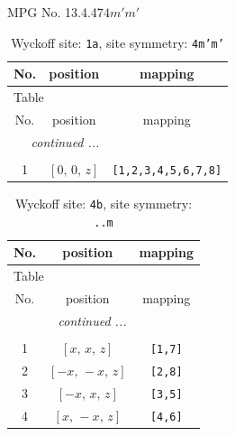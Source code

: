 \documentclass[fleqn,8pt]{jsarticle}
\begin{document}
\setcounter{MaxMatrixCols}{32}

\renewcommand{\tablename}{Table~}
\renewcommand{\figurename}{Figure~}
\begin{center}
\LARGE
MPG No. 13.4.47\quad$4m'm'$
\end{center}
\renewcommand{\arraystretch}{1.2}
\begin{longtable}{ccc}
\caption{Wyckoff site: {\tt 1a}, site symmetry: {\tt 4m'm'}}
 \\
 \hline \hline
No. & position & mapping \\ \hline \endfirsthead

\multicolumn{2}{l}{\tablename\ \thetable{}} \\
 \hline \hline
No. & position & mapping \\ \hline \endhead

 \hline \hline
\multicolumn{2}{r}{\footnotesize\it continued ...} \\ \endfoot

 \hline \hline
\multicolumn{2}{r}{} \\ \endlastfoot

1 & $\left[ 0,\, 0,\, z \right]$ & {\tt [1,2,3,4,5,6,7,8]} \\
\end{longtable}
\renewcommand{\arraystretch}{1.2}
\begin{longtable}{ccc}
\caption{Wyckoff site: {\tt 4b}, site symmetry: {\tt ..m}}
 \\
 \hline \hline
No. & position & mapping \\ \hline \endfirsthead

\multicolumn{2}{l}{\tablename\ \thetable{}} \\
 \hline \hline
No. & position & mapping \\ \hline \endhead

 \hline \hline
\multicolumn{2}{r}{\footnotesize\it continued ...} \\ \endfoot

 \hline \hline
\multicolumn{2}{r}{} \\ \endlastfoot

1 & $\left[ x,\, x,\, z \right]$ & {\tt [1,7]} \\ \hline
2 & $\left[ - x,\, - x,\, z \right]$ & {\tt [2,8]} \\ \hline
3 & $\left[ - x,\, x,\, z \right]$ & {\tt [3,5]} \\ \hline
4 & $\left[ x,\, - x,\, z \right]$ & {\tt [4,6]} \\
\end{longtable}
\end{document}
